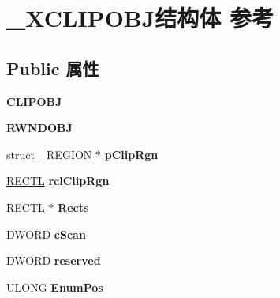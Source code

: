 \hypertarget{struct___x_c_l_i_p_o_b_j}{}\section{\+\_\+\+X\+C\+L\+I\+P\+O\+B\+J结构体 参考}
\label{struct___x_c_l_i_p_o_b_j}
\subsection*{Public 属性}
\begin{DoxyCompactItemize}
\item 
\mbox{\label{struct___x_c_l_i_p_o_b_j_a1abedc4b07f01bf6d7f20ee77c7eaf8e}} 
{\bfseries C\+L\+I\+P\+O\+BJ}
\item 
\mbox{\label{struct___x_c_l_i_p_o_b_j_abc96ca40c4cbdb289260e0b837856cd0}} 
{\bfseries R\+W\+N\+D\+O\+BJ}
\item 
\mbox{\label{struct___x_c_l_i_p_o_b_j_a1356efb2036ca445c5023675f1997f3a}} 
\hyperlink{interfacestruct}{struct} \hyperlink{struct___r_e_g_i_o_n}{\+\_\+\+R\+E\+G\+I\+ON} $\ast$ {\bfseries p\+Clip\+Rgn}
\item 
\mbox{\label{struct___x_c_l_i_p_o_b_j_ace3da954c348c5e7a0ac5aafabd5bc93}} 
\hyperlink{struct___r_e_c_t_l}{R\+E\+C\+TL} {\bfseries rcl\+Clip\+Rgn}
\item 
\mbox{\label{struct___x_c_l_i_p_o_b_j_a8d803390bbd8d6e44cb598cd81f13a48}} 
\hyperlink{struct___r_e_c_t_l}{R\+E\+C\+TL} $\ast$ {\bfseries Rects}
\item 
\mbox{\label{struct___x_c_l_i_p_o_b_j_a1b3d88c7d657fcf52e4208e035a299ad}} 
D\+W\+O\+RD {\bfseries c\+Scan}
\item 
\mbox{\label{struct___x_c_l_i_p_o_b_j_abede9c2724767d9a093479ece4a564a5}} 
D\+W\+O\+RD {\bfseries reserved}
\item 
\mbox{\label{struct___x_c_l_i_p_o_b_j_af4ea0dc0c026a4c6203088ae2f646504}} 
U\+L\+O\+NG {\bfseries Enum\+Pos}
\item 

\end{DoxyCompactItemize}
